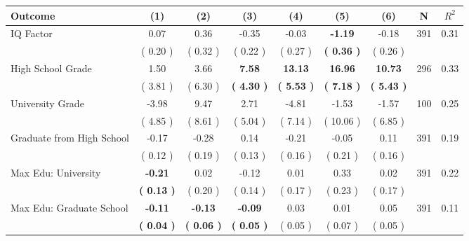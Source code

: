 \begin{tabular}{lcccccccc}
\toprule
 \textbf{Outcome} & \textbf{(1)} & \textbf{(2)} & \textbf{(3)} & \textbf{(4)} & \textbf{(5)} & \textbf{(6)} & \textbf{N} & \textbf{$ R^2$} \\
\midrule
IQ Factor &      0.07 &      0.36 &     -0.35 &     -0.03 & \textbf{    -1.19} &     -0.18 & 391 &       0.31 \\ 
 & (     0.20 ) & (     0.32 ) & (     0.22 ) & (     0.27 ) & \textbf{(     0.36 )} & (     0.26 ) & \\
High School Grade &      1.50 &      3.66 & \textbf{     7.58} & \textbf{    13.13} & \textbf{    16.96} & \textbf{    10.73} & 296 &       0.33 \\ 
 & (     3.81 ) & (     6.30 ) & \textbf{(     4.30 )} & \textbf{(     5.53 )} & \textbf{(     7.18 )} & \textbf{(     5.43 )} & \\
University Grade &     -3.98 &      9.47 &      2.71 &     -4.81 &     -1.53 &     -1.57 & 100 &       0.25 \\ 
 & (     4.85 ) & (     8.61 ) & (     5.04 ) & (     7.14 ) & (    10.06 ) & (     6.85 ) & \\
Graduate from High School &     -0.17 &     -0.28 &      0.14 &     -0.21 &     -0.05 &      0.11 & 391 &       0.19 \\ 
 & (     0.12 ) & (     0.19 ) & (     0.13 ) & (     0.16 ) & (     0.21 ) & (     0.16 ) & \\
Max Edu: University & \textbf{    -0.21} &      0.02 &     -0.12 &      0.01 &      0.33 &      0.02 & 391 &       0.22 \\ 
 & \textbf{(     0.13 )} & (     0.20 ) & (     0.14 ) & (     0.17 ) & (     0.23 ) & (     0.17 ) & \\
Max Edu: Graduate School & \textbf{    -0.11} & \textbf{    -0.13} & \textbf{    -0.09} &      0.03 &      0.01 &      0.05 & 391 &       0.11 \\ 
 & \textbf{(     0.04 )} & \textbf{(     0.06 )} & \textbf{(     0.05 )} & (     0.05 ) & (     0.07 ) & (     0.05 ) & \\
\bottomrule
\end{tabular}
